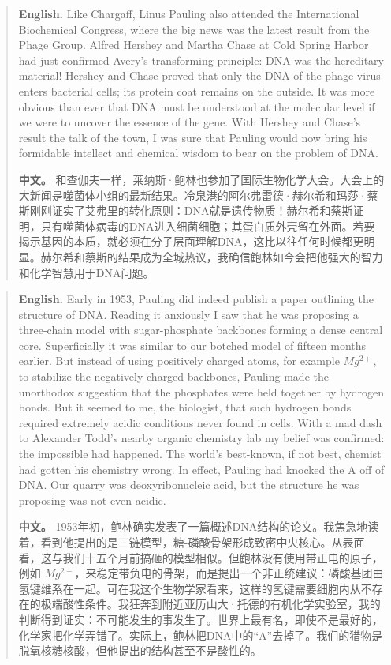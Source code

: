 \begin{quote}
\noindent\textbf{English.} Like Chargaff, Linus Pauling also attended the International Biochemical Congress, where the big news was the latest result from the Phage Group. Alfred Hershey and Martha Chase at Cold Spring Harbor had just confirmed Avery's transforming principle: DNA was the hereditary material! Hershey and Chase proved that only the DNA of the phage virus enters bacterial cells; its protein coat remains on the outside. It was more obvious than ever that DNA must be understood at the molecular level if we were to uncover the essence of the gene. With Hershey and Chase's result the talk of the town, I was sure that Pauling would now bring his formidable intellect and chemical wisdom to bear on the problem of DNA.

\smallskip
\noindent\textbf{中文。} 和查伽夫一样，莱纳斯·鲍林也参加了国际生物化学大会。大会上的大新闻是噬菌体小组的最新结果。冷泉港的阿尔弗雷德·赫尔希和玛莎·蔡斯刚刚证实了艾弗里的转化原则：DNA就是遗传物质！赫尔希和蔡斯证明，只有噬菌体病毒的DNA进入细菌细胞；其蛋白质外壳留在外面。若要揭示基因的本质，就必须在分子层面理解DNA，这比以往任何时候都更明显。赫尔希和蔡斯的结果成为全城热议，我确信鲍林如今会把他强大的智力和化学智慧用于DNA问题。
\end{quote}

\begin{quote}
\noindent\textbf{English.} Early in 1953, Pauling did indeed publish a paper outlining the structure of DNA. Reading it anxiously I saw that he was proposing a three-chain model with sugar-phosphate backbones forming a dense central core. Superficially it was similar to our botched model of fifteen months earlier. But instead of using positively charged atoms, for example \(Mg^{2+}\), to stabilize the negatively charged backbones, Pauling made the unorthodox suggestion that the phosphates were held together by hydrogen bonds. But it seemed to me, the biologist, that such hydrogen bonds required extremely acidic conditions never found in cells. With a mad dash to Alexander Todd's nearby organic chemistry lab my belief was confirmed: the impossible had happened. The world's best-known, if not best, chemist had gotten his chemistry wrong. In effect, Pauling had knocked the A off of DNA. Our quarry was deoxyribonucleic acid, but the structure he was proposing was not even acidic.

\smallskip
\noindent\textbf{中文。} 1953年初，鲍林确实发表了一篇概述DNA结构的论文。我焦急地读着，看到他提出的是三链模型，糖-磷酸骨架形成致密中央核心。从表面看，这与我们十五个月前搞砸的模型相似。但鲍林没有使用带正电的原子，例如 \(Mg^{2+}\)，来稳定带负电的骨架，而是提出一个非正统建议：磷酸基团由氢键维系在一起。可在我这个生物学家看来，这样的氢键需要细胞内从不存在的极端酸性条件。我狂奔到附近亚历山大·托德的有机化学实验室，我的判断得到证实：不可能发生的事发生了。世界上最有名，即使不是最好的，化学家把化学弄错了。实际上，鲍林把DNA中的“A”去掉了。我们的猎物是脱氧核糖核酸，但他提出的结构甚至不是酸性的。
\end{quote}

